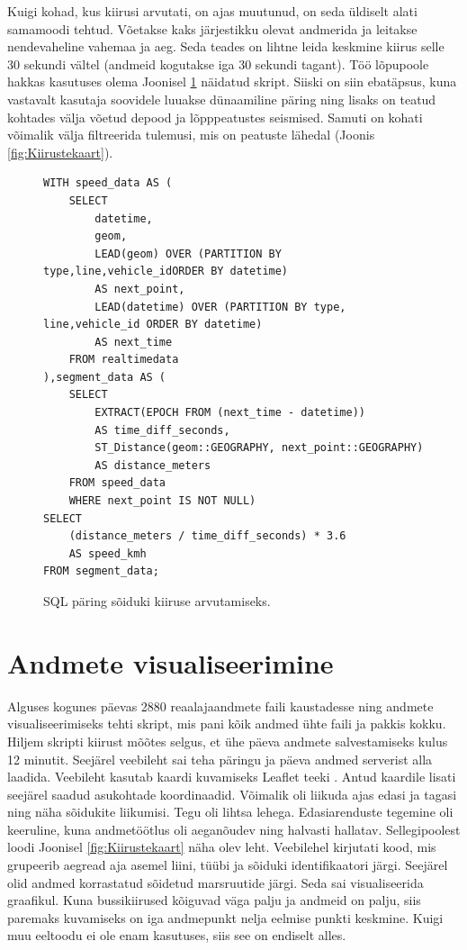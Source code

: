 Kuigi kohad, kus kiirusi arvutati, on ajas muutunud, on seda üldiselt alati samamoodi tehtud. Võetakse kaks järjestikku olevat andmerida ja leitakse nendevaheline vahemaa ja aeg. Seda teades on lihtne leida keskmine kiirus selle 30 sekundi vältel (andmeid kogutakse iga 30 sekundi tagant). Töö lõpupoole hakkas kasutuses olema Joonisel \ref{fig:kiirusteSQLskript} näidatud skript. Siiski on siin ebatäpsus, kuna vastavalt kasutaja soovidele luuakse dünaamiline päring ning lisaks on teatud kohtades välja võetud depood ja lõpppeatustes seismised. Samuti on kohati võimalik välja filtreerida tulemusi, mis on peatuste lähedal (Joonis \ref{fig:Kiirustekaart}).  

\begin{figure}[h!]
    \centering
    \scriptsize
\begin{lstlisting}
WITH speed_data AS (
    SELECT
        datetime,
        geom,
        LEAD(geom) OVER (PARTITION BY type,line,vehicle_idORDER BY datetime)
        AS next_point,
        LEAD(datetime) OVER (PARTITION BY type, line,vehicle_id ORDER BY datetime)
        AS next_time
    FROM realtimedata
),segment_data AS (
    SELECT
        EXTRACT(EPOCH FROM (next_time - datetime)) 
        AS time_diff_seconds, 
        ST_Distance(geom::GEOGRAPHY, next_point::GEOGRAPHY) 
        AS distance_meters
    FROM speed_data
    WHERE next_point IS NOT NULL)
SELECT 
    (distance_meters / time_diff_seconds) * 3.6 
    AS speed_kmh 
FROM segment_data;
\end{lstlisting}
\caption{SQL päring sõiduki kiiruse arvutamiseks.}
\label{fig:kiirusteSQLskript}
\end{figure}

\section{Andmete visualiseerimine}

Alguses kogunes päevas 2880 reaalajaandmete faili kaustadesse ning andmete visualiseerimiseks tehti skript, mis pani kõik andmed ühte faili ja pakkis kokku. Hiljem skripti kiirust mõõtes selgus, et ühe päeva andmete salvestamiseks kulus 12 minutit. Seejärel veebileht sai teha päringu ja päeva andmed serverist alla laadida. Veebileht kasutab kaardi kuvamiseks Leaflet teeki \cite{leafletjs}. Antud kaardile lisati seejärel saadud asukohtade koordinaadid. Võimalik oli liikuda ajas edasi ja tagasi ning näha sõidukite liikumisi. Tegu oli lihtsa lehega. Edasiarenduste tegemine oli keeruline, kuna andmetöötlus oli aeganõudev ning halvasti hallatav. Sellegipoolest loodi Joonisel \ref{fig:Kiirustekaart} näha olev leht. Veebilehel kirjutati kood, mis grupeerib aegread aja asemel liini, tüübi ja sõiduki identifikaatori järgi. Seejärel olid andmed korrastatud sõidetud marsruutide järgi. Seda sai visualiseerida graafikul. Kuna bussikiirused kõiguvad väga palju ja andmeid on palju, siis paremaks kuvamiseks on iga andmepunkt nelja eelmise punkti keskmine. Kuigi muu eeltoodu ei ole enam kasutuses, siis see on endiselt alles.

